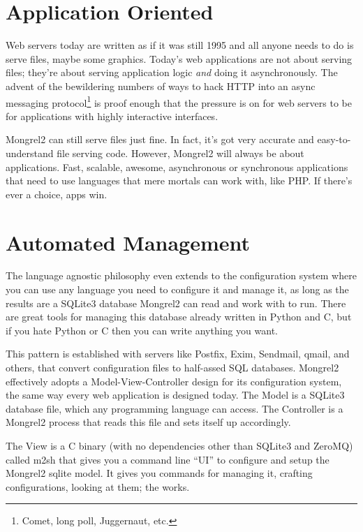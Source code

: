 \section{Application Oriented}

Web servers today are written as if it was still 1995 and all anyone needs to do
is serve files, maybe some graphics.  Today's web applications are not about serving
files; they're about serving application logic \emph{and} doing it asynchronously.
The advent of the bewildering numbers of ways to hack HTTP into an async messaging
protocol\footnote{Comet, long poll, Juggernaut, etc.} is proof enough that the
pressure is on for web servers to be for applications with highly interactive
interfaces.

Mongrel2 can still serve files just fine.  In fact, it's got very accurate and
easy-to-understand file serving code.  However, Mongrel2 will always be about applications.
Fast, scalable, awesome, asynchronous or synchronous applications that need to use languages
that mere mortals can work with, like PHP.  If there's ever a choice, apps win.

\section{Automated Management}

The language agnostic philosophy even extends to the configuration system where
you can use any language you need to configure it and manage it, as long as the
results are a SQLite3 database Mongrel2 can read and work with to run.  There
are great tools for managing this database already written in Python and C, but
if you hate Python or C then you can write anything you want.

This pattern is established with servers like Postfix, Exim, Sendmail, qmail,
and others, that convert configuration files to half-assed SQL databases.
Mongrel2 effectively adopts a Model-View-Controller design for its
configuration system, the same way every web application is designed today.
The Model is a SQLite3 database file, which any programming language can access.
The Controller is a Mongrel2 process that reads this file and sets itself up
accordingly.

The View is a C binary (with no dependencies other than SQLite3 and ZeroMQ)
called m2sh that gives you a command line ``UI'' to configure and setup the
Mongrel2 sqlite model.  It gives you commands for managing it, crafting
configurations, looking at them; the works.

